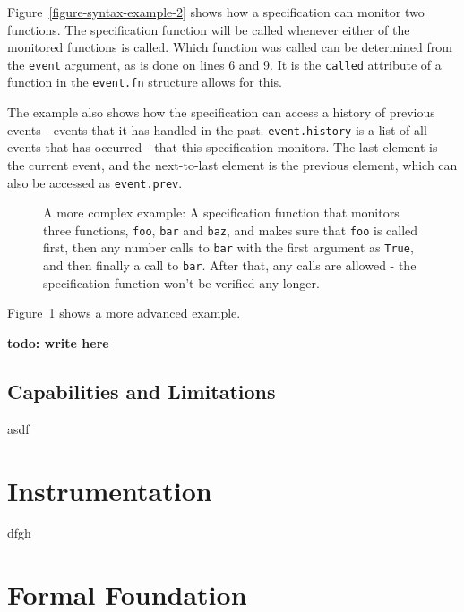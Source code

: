 \documentclass[a4paper,11pt]{kth-mag}
\newcommand{\todo}[1]{\textbf{todo: #1}}
\begin{document}
Figure~\ref{figure-syntax-example-2} shows how a specification can monitor two
functions. The specification function will be called whenever either of the
monitored functions is called. Which function was called can be determined from
the \texttt{event} argument, as is done on lines 6 and 9. It is the
\texttt{called} attribute of a function in the \texttt{event.fn} structure
allows for this.

The example also shows how the specification can access a history of previous
events - events that it has handled in the past. \texttt{event.history} is a
list of all events that has occurred - that this specification monitors. The
last element is the current event, and the next-to-last element is the previous
element, which can also be accessed as \texttt{event.prev}.

\begin{figure}[h!]

	\begin{center}
	\begin{minipage}{0.7\textwidth}
	
	\end{minipage}
	\end{center}

	\caption{A more complex example: A specification function that monitors three
		functions, \texttt{foo}, \texttt{bar} and \texttt{baz}, and makes sure that
		\texttt{foo} is called first, then any number calls to \texttt{bar} with
		the first argument as \texttt{True}, and then finally a call to
	\texttt{bar}. After that, any calls are allowed - the specification function
won't be verified any longer.}
	\label{figure-syntax-example-3}
\end{figure}

Figure~\ref{figure-syntax-example-3} shows a more advanced example.

\todo{write here}


\subsection{Capabilities and Limitations}

asdf

\section{Instrumentation} \label{section-method-instrumentation}

dfgh


\section{Formal Foundation} \label{section-method-syntax}
\end{document}
